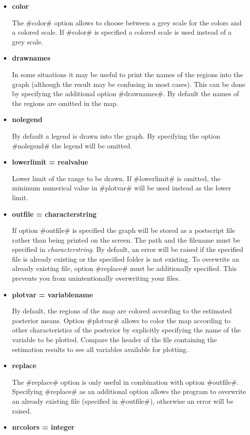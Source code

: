 \begin{itemize}
\item {\bf color}

The #color# option allows to choose between a grey scale for the
colors and a colored scale. If #color# is specified a colored
scale is used instead of a grey scale.
\item {\bf drawnames}

In some situations it may be useful to print the names of the
regions into the graph (although the result may be confusing in
most cases). This can be done by specifying the additional option
#drawnames#. By default the names of the regions are omitted in
the map.
\item {\bf nolegend}

By default a legend is drawn into the graph. By specifying the
option #nolegend# the legend will be omitted.
\item {\bf lowerlimit = realvalue}

Lower limit of the range to be drawn. If #lowerlimit# is omitted,
the minimum numerical value in #plotvar# will be used instead as
the lower limit.
\item {\bf outfile = characterstring}

If option #outfile# is specified the graph will be stored as a
postscript file rather than being printed on the screen. The path
and the filename must be specified in {\em characterstring}. By
default, an error will be raised if the specified file is already
existing or the specified folder is not existing. To overwrite an
already existing file, option #replace# must be additionally
specified. This prevents you from unintentionally overwriting your
files.
\item {\bf plotvar = variablename}

By default, the regions of the map are colored according to the
estimated posterior means. Option #plotvar# allows to color the
map according to other characteristics of the posterior by
explicitly specifying the name of the variable to be plotted.
Compare the header of the file containing the estimation results
to see all variables available for plotting.
\item {\bf replace}

The #replace# option is only useful in combination with option
#outfile#. Specifying #replace# as an additional option allows the
program to overwrite an already existing file (specified in
#outfile#), otherwise an error will be raised.
\item {\bf nrcolors = integer}


\end{itemize}
